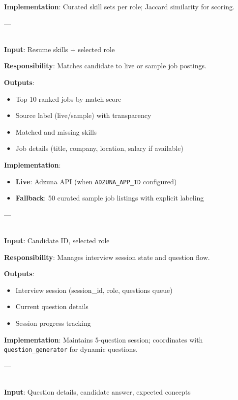 \documentclass[11pt]{article}
\begin{document}
\begin{description}[leftmargin=3cm, style=nextline]
  \textbf{Implementation}: Curated skill sets per role; Jaccard similarity for scoring.

  ---

  \item[\textbf{job\_recommender\_agent}]
  \hfill \\
  \textbf{Input}: Resume skills + selected role

  \textbf{Responsibility}: Matches candidate to live or sample job postings.

  \textbf{Outputs}:
  \begin{itemize}
    \item Top-10 ranked jobs by match score
    \item Source label (live/sample) with transparency
    \item Matched and missing skills
    \item Job details (title, company, location, salary if available)
  \end{itemize}

  \textbf{Implementation}:
  \begin{itemize}
    \item \textbf{Live}: Adzuna API (when \texttt{ADZUNA\_APP\_ID} configured)
    \item \textbf{Fallback}: 50 curated sample job listings with explicit labeling
  \end{itemize}

  ---

  \item[\textbf{interview\_orchestrator}]
  \hfill \\
  \textbf{Input}: Candidate ID, selected role

  \textbf{Responsibility}: Manages interview session state and question flow.

  \textbf{Outputs}:
  \begin{itemize}
    \item Interview session (session\_id, role, questions queue)
    \item Current question details
    \item Session progress tracking
  \end{itemize}

  \textbf{Implementation}: Maintains 5-question session; coordinates with \texttt{question\_generator} for dynamic questions.

  ---

  \item[\textbf{evaluator\_agent}]
  \hfill \\
  \textbf{Input}: Question details, candidate answer, expected concepts


\end{description}
\end{document}
